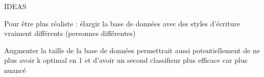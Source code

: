 IDEAS 

Pour être plus réaliste : élargir la base de données avec des styles d'écriture vraiment différents (personnes différentes)

Augmenter la taille de la base de données permettrait aussi potentiellement de ne plus avoir k optimal en 1 et d'avoir un second classifieur plus efficace car plus nuancé
